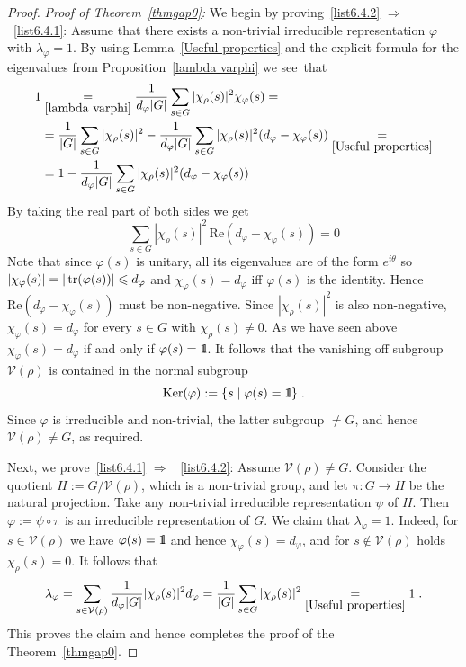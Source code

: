 \documentclass[11pt]{article}
\theoremstyle{definition}
\numberwithin{equation}{section}
\numberwithin{figure}{section}
\numberwithin{table}{section}
\DeclareMathOperator{\tr}{tr}
\newcommand{\cV}{{\mathcal{V}}}
\newcommand*\id{{1\hskip-2.5pt{\rm l}}}
\renewcommand\leq {\leqslant}
\newcommand\< {\mathcal{h}}
\renewcommand\> {\mathcal{i}}
\begin{document}
\begin{proof}\emph{Proof of Theorem~\ref{thmgap0}:}
We begin by proving~\eqref{list6.4.2} $\Rightarrow$~\eqref{list6.4.1}: Assume that there exists a non-trivial irreducible representation $\varphi$ with $\lambda_\varphi = 1$. By using Lem\-ma~\ref{Useful properties} and the explicit formula for the eigenvalues from Proposition~\ref{lambda varphi} we see~that
\begin{equation*}
\begin{split}
1 & \underset{\ref{lambda varphi}}{=} \frac{1}{d_\varphi| G|} \sum_{s\in G} | \chi_\rho(s)|^2\chi_\varphi(s) = \\
& = \frac{1}{| G|} \sum_{s\in G} | \chi_\rho(s)|^2 - \frac{1}{d_\varphi| G|} \sum_{s\in G} | \chi_\rho(s)|^2 (d_\varphi - \chi_\varphi(s)) \underset{\ref{Useful properties}}{=} \\
& = 1 - \frac{1}{d_\varphi| G|} \sum_{s\in G} | \chi_\rho(s)|^2 (d_\varphi - \chi_\varphi(s))
\end{split}
\end{equation*}
By taking the real part of both sides we get
\[
\sum_{s\in G} | \chi_\rho(s) |^2\,\text{Re}(d_\varphi - \chi_\varphi(s)) = 0
\]
Note that since $\varphi(s)$ is unitary, all its eigenvalues are of the form $e^{i\theta}$ so $| \chi_\varphi (s) |\linebreak= | \tr(\varphi(s)) |\leq d_\varphi$ and $\chi_\varphi(s)=d_\varphi$ iff $\varphi(s)$ is the identity. Hence $\text{Re}(d_\varphi - \chi_\varphi(s))$ must be non-negative. Since $| \chi_\rho(s) |^2$ is also non-negative, $\chi_\varphi(s)=d_\varphi$ for every $s \in G$ with $\chi_\rho(s) \neq 0$. As we have seen above $\chi_\varphi(s)=d_\varphi$ if and only if $\varphi(s)=\id$. It follows that the vanishing off subgroup $\cV(\rho)$ is contained in the normal subgroup
\[
\text{Ker}(\varphi) := \{s\mid\varphi(s)=\id\}\;.
\]
Since $\varphi$ is irreducible and non-trivial, the latter subgroup
$\neq G$, and hence $\cV(\rho) \neq G$, as required.


Next, we prove~\eqref{list6.4.1} $\Rightarrow$~ \eqref{list6.4.2}: Assume $\cV(\rho)\not=G$. Consider the quotient $H:=G/\cV(\rho)$, which is a non-trivial group, and let $\pi: G \to H$ be the natural projection. Take any non-trivial irreducible representation $\psi$ of $H$. Then $\varphi:= \psi \circ \pi$ is an irreducible representation of $G$. We claim that $\lambda_\varphi=1$. Indeed, for $s \in \cV(\rho)$ we have $\varphi(s)=\id$ and hence $\chi_\varphi(s) = d_\varphi$, and for $s \notin \cV(\rho)$ holds $\chi_\rho(s) = 0$. It follows that
\begin{equation*}
\begin{split}
\lambda_{\varphi} = \sum_{s\in \cV(\rho)} \frac{1}{d_{\varphi} | G |} | \chi_\rho(s) |^2 d_{\varphi} = \frac{1}{| G |} \sum_{s\in G} | \chi_\rho(s) |^2 \underset{\ref{Useful properties}}{=} 1\;.
\end{split}
\end{equation*}
This proves the claim and hence completes the proof of the Theorem~\ref{thmgap0}.
\end{proof}
\end{document}
